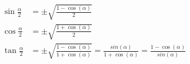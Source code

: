\begin{equation}
\begin{split}
    \sin \frac{\alpha}{2} &= \pm \sqrt{\frac{1 - \cos(\alpha)}{2}} \\
    \cos \frac{\alpha}{2} &= \pm \sqrt{\frac{1 + \cos(\alpha)}{2}} \\
    \tan \frac{\alpha}{2} &= \pm \sqrt{\frac{1 - \cos(\alpha)}{1 + \cos(\alpha)}}
        = \frac{sin(\alpha)}{1 + \cos(\alpha)}
        = \frac{1 - \cos(\alpha)}{sin(\alpha)}
\end{split}
\end{equation}